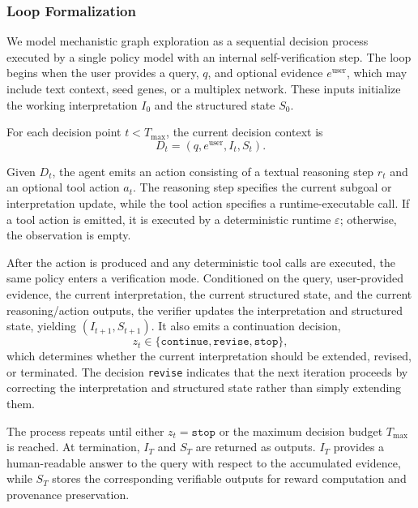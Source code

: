 \documentclass[thesis,letterpaper,12pt]{utthesis}
\begin{document}
\subsubsection{Loop Formalization}
We model mechanistic graph exploration as a sequential decision process executed by a single policy model with an internal self-verification step. The loop begins when the user provides a query, $q$, and optional evidence $e^{\text{user}}$, which may include text context, seed genes, or a multiplex network. These inputs initialize the working interpretation $I_0$ and the structured state $S_0$.

For each decision point $t < T_{\max}$, the current decision context is
\[
D_t = (q, e^{\text{user}}, I_t, S_t).
\]

Given $D_t$, the agent emits an action consisting of a textual reasoning step $r_t$ and an optional tool action $a_t$. The reasoning step specifies the current subgoal or interpretation update, while the tool action specifies a runtime-executable call. If a tool action is emitted, it is executed by a deterministic runtime $\varepsilon$; otherwise, the observation is empty.

After the action is produced and any deterministic tool calls are executed, the same policy enters a verification mode. Conditioned on the query, user-provided evidence, the current interpretation, the current structured state, and the current reasoning/action outputs, the verifier updates the interpretation and structured state, yielding $(I_{t+1}, S_{t+1})$. It also emits a continuation decision,
\[
z_t \in \{\texttt{continue}, \texttt{revise}, \texttt{stop}\},
\]
which determines whether the current interpretation should be extended, revised, or terminated. The decision \texttt{revise} indicates that the next iteration proceeds by correcting the interpretation and structured state rather than simply extending them.

The process repeats until either $z_t = \texttt{stop}$ or the maximum decision budget $T_{\max}$ is reached. At termination, $I_T$ and $S_T$ are returned as outputs. $I_T$ provides a human-readable answer to the query with respect to the accumulated evidence, while $S_T$ stores the corresponding verifiable outputs for reward computation and provenance preservation.
\end{document}
